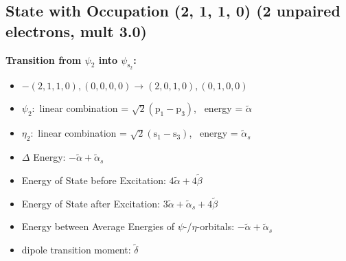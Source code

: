 \documentclass[12pt,a4paper]{article}
\begin{document}
\subsection*{State with Occupation (2, 1, 1, 0) (2 unpaired electrons, mult 3.0)}
        \noindent\textbf{Transition from $\psi_{2}$ into $\psi_{\text{s}_{2}}$:}
        \begin{itemize}
            \item $- (2, 1, 1, 0), (0, 0, 0, 0) \rightarrow (2, 0, 1, 0), (0, 1, 0, 0)$
        
            \item $\psi_{2}:$ linear combination = $\sqrt{2} \left(\text{p}_{1} - \text{p}_{3}\right)$, \
            energy = $\tilde{\alpha}$
            
            \item $\eta_{2}:$ linear combination = $\sqrt{2} \left(\text{s}_{1} - \text{s}_{3}\right)$, \
            energy = $\tilde{\alpha}_{s}$
            
                \item $\Delta$ Energy: $- \tilde{\alpha} + \tilde{\alpha}_{s}$
                \item Energy of State before Excitation: $4 \tilde{\alpha} + 4 \tilde{\beta}$
                \item Energy of State after Excitation: $3 \tilde{\alpha} + \tilde{\alpha}_{s} + 4 \tilde{\beta}$
                \item Energy between Average Energies of $\psi$-/$\eta$-orbitals: $- \tilde{\alpha} + \tilde{\alpha}_{s}$
            
            \item dipole transition moment: $\tilde{\delta}$
        
        \end{itemize}
        
\end{document}
